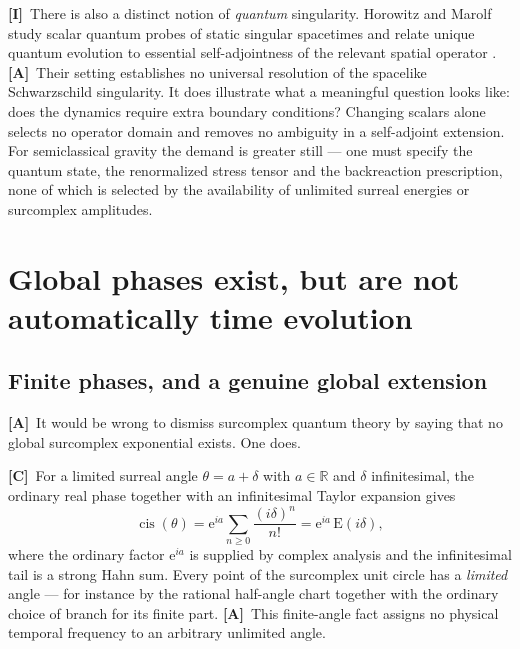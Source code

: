 \documentclass[11pt,letterpaper]{article}
\numberwithin{equation}{section}
\theoremstyle{definition}
\theoremstyle{remark}
\newcommand{\R}{\mathbb R}
\DeclareMathOperator{\cis}{cis}
\newcommand{\ee}{\mathrm e}
\newcommand{\Emm}{\mathrm{E}}
\newcommand{\TC}{\textcolor{TierC}{\textsf{\bfseries[C]}}}
\newcommand{\TA}{\textcolor{TierA}{\textsf{\bfseries[A]}}}
\newcommand{\TI}{\textcolor{TierI}{\textsf{\bfseries[I]}}}
\begin{document}
\TI\ There is also a distinct notion of \emph{quantum} singularity. Horowitz
and Marolf study scalar quantum probes of static singular spacetimes and
relate unique quantum evolution to essential self-adjointness of the relevant
spatial operator \cite{phys:HM}. \TA\ Their setting establishes no universal
resolution of the spacelike Schwarzschild singularity. It does illustrate what
a meaningful question looks like: does the dynamics require extra boundary
conditions? Changing scalars alone selects no operator domain and removes no
ambiguity in a self-adjoint extension. For semiclassical gravity the demand is
greater still --- one must specify the quantum state, the renormalized stress
tensor and the backreaction prescription, none of which is selected by the
availability of unlimited surreal energies or surcomplex amplitudes.

\section{Global phases exist, but are not automatically time evolution}
\label{phys:sec:phases}

\subsection{Finite phases, and a genuine global extension}
\label{phys:sub:finitephase}

\TA\ It would be wrong to dismiss surcomplex quantum theory by saying that no
global surcomplex exponential exists. One does.

\TC\ For a limited surreal angle $\theta=a+\delta$ with $a\in\R$ and $\delta$
infinitesimal, the ordinary real phase together with an infinitesimal Taylor
expansion gives
\begin{equation}\label{phys:eq:finitephase}
\cis(\theta)=\ee^{ia}\sum_{n\ge0}\frac{(i\delta)^{n}}{n!}
=\ee^{ia}\,\Emm(i\delta),
\end{equation}
where the ordinary factor $\ee^{ia}$ is supplied by complex analysis and the
infinitesimal tail is a strong Hahn sum. Every point of the surcomplex unit
circle has a \emph{limited} angle --- for instance by the rational half-angle
chart together with the ordinary choice of branch for its finite part. \TA\
This finite-angle fact assigns no physical temporal frequency to an arbitrary
unlimited angle.
\end{document}

